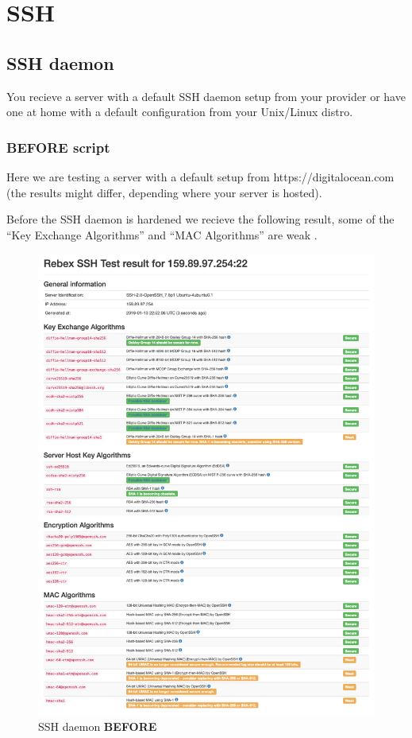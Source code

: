\section{SSH}
\subsection{SSH daemon}
You recieve a server with a default SSH daemon setup from your provider or have one at home with a default configuration from your Unix/Linux distro.
\subsubsection{BEFORE script}
Here we are testing a server with a default setup from https://digitalocean.com (the results might differ, depending where your server is hosted).

Before the SSH daemon is hardened we recieve the following result, some of the \enquote{Key Exchange Algorithms} and \enquote{MAC Algorithms} are weak \cite{sshcheck}.

\begin{figure}[H]
        \centering
        \includegraphics[width=0.8\linewidth]{pics/score_SSH_before}
        \caption{SSH daemon \textbf{BEFORE} }
        \label{fig:scoresshbefore}
\end{figure}
\newpage


